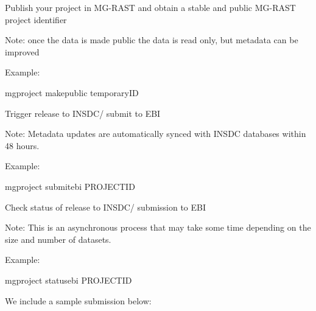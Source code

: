 \documentclass[letterpaper,10pt,english]{sphinxmanual}
\begin{document}
Publish your project in MG-RAST and obtain a stable and public MG-RAST
project identifier

Note: once the data is made public the data is read only, but metadata
can be improved

Example:

\begin{sphinxVerbatim}[commandchars=\\\{\}]
mg\PYGZhy{}project make\PYGZhy{}public \PYGZdl{}temporary\PYGZus{}ID
\end{sphinxVerbatim}

Trigger release to INSDC/ submit to EBI

Note: Metadata updates are automatically synced with INSDC databases
within 48 hours.

Example:

\begin{sphinxVerbatim}[commandchars=\\\{\}]
mg\PYGZhy{}project submit\PYGZhy{}ebi \PYGZdl{}PROJECT\PYGZus{}ID
\end{sphinxVerbatim}

Check status of release to INSDC/ submission to EBI

Note: This is an asynchronous process that may take some time depending
on the size and number of datasets.

Example:

\begin{sphinxVerbatim}[commandchars=\\\{\}]
mg\PYGZhy{}project status\PYGZhy{}ebi \PYGZdl{}PROJECT\PYGZus{}ID
\end{sphinxVerbatim}

We include a sample submission below:
\end{document}

